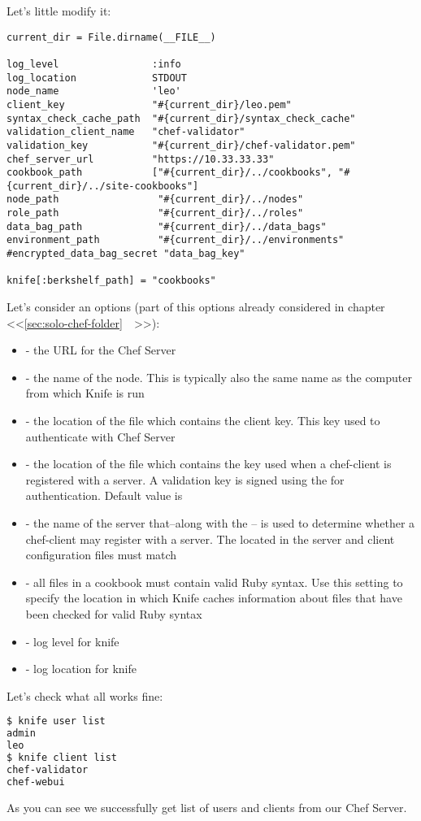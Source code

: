 Let's little modify it:

\begin{lstlisting}[label=lst:my-server-cloud-knife4,title=my-server-cloud/.chef/knife.rb]
current_dir = File.dirname(__FILE__)

log_level                :info
log_location             STDOUT
node_name                'leo'
client_key               "#{current_dir}/leo.pem"
syntax_check_cache_path  "#{current_dir}/syntax_check_cache"
validation_client_name   "chef-validator"
validation_key           "#{current_dir}/chef-validator.pem"
chef_server_url          "https://10.33.33.33"
cookbook_path            ["#{current_dir}/../cookbooks", "#{current_dir}/../site-cookbooks"]
node_path                 "#{current_dir}/../nodes"
role_path                 "#{current_dir}/../roles"
data_bag_path             "#{current_dir}/../data_bags"
environment_path          "#{current_dir}/../environments"
#encrypted_data_bag_secret "data_bag_key"

knife[:berkshelf_path] = "cookbooks"
\end{lstlisting}

Let's consider an options (part of this options already considered in chapter <<\ref{sec:solo-chef-folder}~~>>):

\begin{itemize}
  \item {} - the URL for the Chef Server
  \item {} - the name of the node. This is typically also the same name as the computer from which Knife is run
  \item {} - the location of the file which contains the client key. This key used to authenticate with Chef Server
  \item {} - the location of the file which contains the key used when a chef-client is registered with a server. A validation key is signed using the  for authentication. Default value is 
  \item {} - the name of the server that–along with the  – is used to determine whether a chef-client may register with a server. The  located in the server and client configuration files must match
  \item {} - all files in a cookbook must contain valid Ruby syntax. Use this setting to specify the location in which Knife caches information about files that have been checked for valid Ruby syntax
  \item {} - log level for knife
  \item {} - log location for knife
\end{itemize}

Let's check what all works fine:

\begin{lstlisting}[language=Bash,label=lst:my-server-cloud-knife5]
$ knife user list
admin
leo
$ knife client list
chef-validator
chef-webui
\end{lstlisting}

As you can see we successfully get list of users and clients from our Chef Server.
